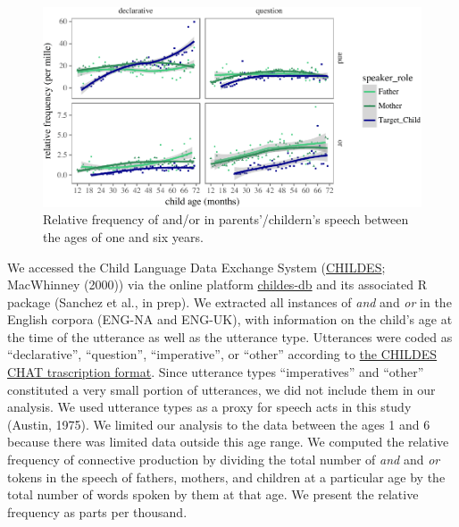 \documentclass[10pt, letterpaper]{article}
\newenvironment{CodeChunk}{}{}
\begin{document}
\begin{CodeChunk}
\begin{figure}[t]

{\centering \includegraphics{figs/byspeechActPlots-1} 

}

\caption[Relative frequency of and/or in parents'/childern's speech between the ages of one and six years]{Relative frequency of and/or in parents'/childern's speech between the ages of one and six years.}\label{fig:byspeechActPlots}
\end{figure}
\end{CodeChunk}

We accessed the Child Language Data Exchange System
(\href{https://childes.talkbank.org/}{CHILDES}; MacWhinney (2000)) via
the online platform \href{http://childes-db.stanford.edu/}{childes-db}
and its associated R package (Sanchez et al., in prep). We extracted all
instances of \emph{and} and \emph{or} in the English corpora (ENG-NA and
ENG-UK), with information on the child's age at the time of the
utterance as well as the utterance type. Utterances were coded as
``declarative'', ``question'', ``imperative'', or ``other'' according to
\href{https://talkbank.org/manuals/CHAT.html\#_Toc486414422}{the CHILDES
CHAT trascription format}. Since utterance types ``imperatives'' and
``other'' constituted a very small portion of utterances, we did not
include them in our analysis. We used utterance types as a proxy for
speech acts in this study (Austin, 1975). We limited our analysis to the
data between the ages 1 and 6 because there was limited data outside
this age range. We computed the relative frequency of connective
production by dividing the total number of \emph{and} and \emph{or}
tokens in the speech of fathers, mothers, and children at a particular
age by the total number of words spoken by them at that age. We present
the relative frequency as parts per thousand.
\end{document}

